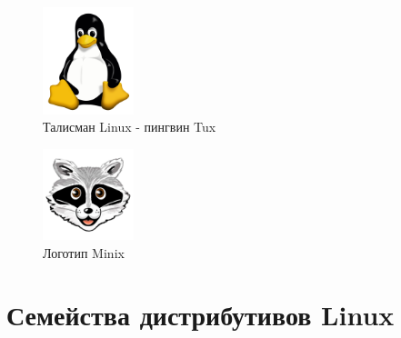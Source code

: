\documentclass[bachelor, och, pract, times]{SCWorks}
\begin{document}
\begin{figure}[t]
    \centering
    \includegraphics[width=100px]{Tux.png}
    \caption{Талисман Linux - пингвин Tux}
    \label{fig:linux_symbol}
\end{figure}

\begin{figure}[t]
    \centering
    \includegraphics[width=100px]{BVXyPwe.png}
    \caption{Логотип Minix}
    \label{fig:minix_symbol}
\end{figure}

\section{Семейства дистрибутивов Linux}
\end{document}
